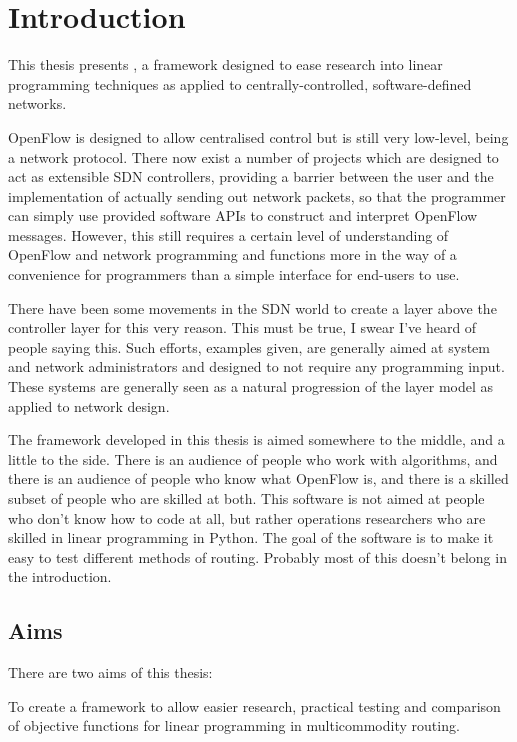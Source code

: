 \chapter{Introduction}

This thesis presents \thesis{}, a framework designed to ease research into linear programming techniques as applied to centrally-controlled, software-defined networks.

OpenFlow is designed to allow centralised control but is still very low-level, being a network protocol. There now exist a number of projects which are designed to act as extensible SDN controllers, providing a barrier between the user and the implementation of actually sending out network packets, so that the programmer can simply use provided software APIs to construct and interpret OpenFlow messages. However, this still requires a certain level of understanding of OpenFlow and network programming and functions more in the way of a convenience for programmers than a simple interface for end-users to use.

There have been some movements in the SDN world to create a layer above the controller layer for this very reason. This must be true, I swear I've heard of people saying this. Such efforts, examples given, are generally aimed at system and network administrators and designed to not require any programming input. These systems are generally seen as a natural progression of the layer model as applied to network design.

The framework developed in this thesis is aimed somewhere to the middle, and a little to the side. There is an audience of people who work with algorithms, and there is an audience of people who know what OpenFlow is, and there is a skilled subset of people who are skilled at both. This software is not aimed at people who don't know how to code at all, but rather operations researchers who are skilled in linear programming in Python. The goal of the software is to make it easy to test different methods of routing. Probably most of this doesn't belong in the introduction.

\section{Aims}

There are two aims of this thesis:

To create a framework to allow easier research, practical testing and comparison of objective functions for linear programming in multicommodity routing.

